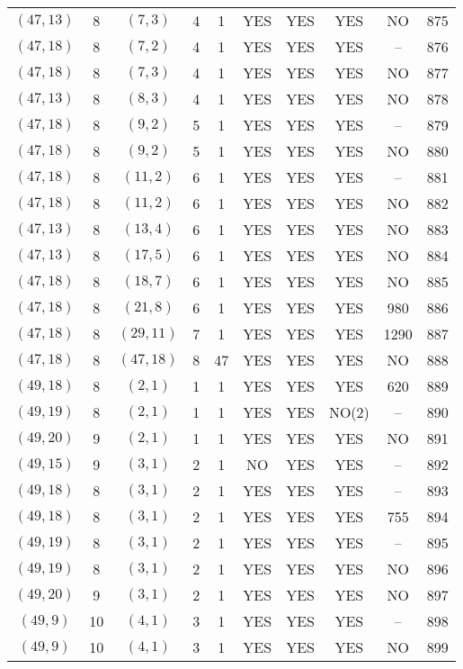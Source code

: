 \begin{longtable}{|c|c|c|c|c|c|c|c|c|c|}
$(47, 13)$ & 8 & $(7, 3)$ & 4 & 1 & YES & YES & YES & NO & 875\\
$(47, 18)$ & 8 & $(7, 2)$ & 4 & 1 & YES & YES & YES & -- & 876\\
$(47, 18)$ & 8 & $(7, 3)$ & 4 & 1 & YES & YES & YES & NO & 877\\
$(47, 13)$ & 8 & $(8, 3)$ & 4 & 1 & YES & YES & YES & NO & 878\\
$(47, 18)$ & 8 & $(9, 2)$ & 5 & 1 & YES & YES & YES & -- & 879\\
$(47, 18)$ & 8 & $(9, 2)$ & 5 & 1 & YES & YES & YES & NO & 880\\
$(47, 18)$ & 8 & $(11, 2)$ & 6 & 1 & YES & YES & YES & -- & 881\\
$(47, 18)$ & 8 & $(11, 2)$ & 6 & 1 & YES & YES & YES & NO & 882\\
$(47, 13)$ & 8 & $(13, 4)$ & 6 & 1 & YES & YES & YES & NO & 883\\
$(47, 13)$ & 8 & $(17, 5)$ & 6 & 1 & YES & YES & YES & NO & 884\\
$(47, 18)$ & 8 & $(18, 7)$ & 6 & 1 & YES & YES & YES & NO & 885\\
$(47, 18)$ & 8 & $(21, 8)$ & 6 & 1 & YES & YES & YES & 980 & 886\\
$(47, 18)$ & 8 & $(29, 11)$ & 7 & 1 & YES & YES & YES & 1290 & 887\\
$(47, 18)$ & 8 & $(47, 18)$ & 8 & 47 & YES & YES & YES & NO & 888\\
$(49, 18)$ & 8 & $(2, 1)$ & 1 & 1 & YES & YES & YES & 620 & 889\\
$(49, 19)$ & 8 & $(2, 1)$ & 1 & 1 & YES & YES & NO(2) & -- & 890\\
$(49, 20)$ & 9 & $(2, 1)$ & 1 & 1 & YES & YES & YES & NO & 891\\
$(49, 15)$ & 9 & $(3, 1)$ & 2 & 1 & NO & YES & YES & -- & 892\\
$(49, 18)$ & 8 & $(3, 1)$ & 2 & 1 & YES & YES & YES & -- & 893\\
$(49, 18)$ & 8 & $(3, 1)$ & 2 & 1 & YES & YES & YES & 755 & 894\\
$(49, 19)$ & 8 & $(3, 1)$ & 2 & 1 & YES & YES & YES & -- & 895\\
$(49, 19)$ & 8 & $(3, 1)$ & 2 & 1 & YES & YES & YES & NO & 896\\
$(49, 20)$ & 9 & $(3, 1)$ & 2 & 1 & YES & YES & YES & NO & 897\\
$(49, 9)$ & 10 & $(4, 1)$ & 3 & 1 & YES & YES & YES & -- & 898\\
$(49, 9)$ & 10 & $(4, 1)$ & 3 & 1 & YES & YES & YES & NO & 899\\

\end{longtable}
